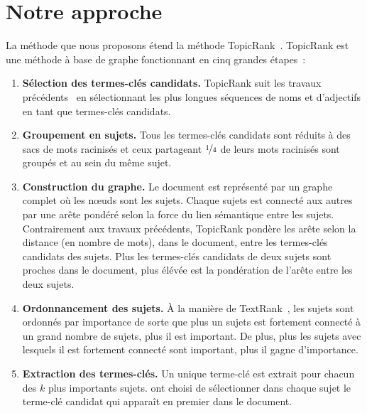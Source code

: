 \section{Notre approche}
\label{sec:main-domain_specific_keyphrase_annotation-topiccorank}
  La méthode que nous proposons étend la méthode
  TopicRank~\cite{bougouin2013topicrank}. TopicRank est une méthode à base de
  graphe fonctionnant en cinq grandes étapes~:
  \begin{enumerate}
    \item{\textbf{Sélection des termes-clés candidats.} TopicRank suit les
          travaux précédents~\cite{wan2008expandrank,hassan2010conundrums} en
          sélectionnant les plus longues séquences de noms et d'adjectifs en
          tant que termes-clés candidats.}
    \item{\textbf{Groupement en sujets.} Tous les termes-clés candidats sont
          réduits à des sacs de mots racinisés et ceux partageant
          $\unitfrac{1}{4}$ de leurs mots racinisés sont groupés et au sein du
          même sujet.}
    \item{\textbf{Construction du graphe.} Le document est représenté par un
          graphe complet où les n\oe{}uds sont les sujets. Chaque sujets est
          connecté aux autres par une arête pondéré selon la force du lien
          sémantique entre les sujets. Contrairement aux travaux précédents,
          TopicRank pondère les arête selon la distance (en nombre de mots),
          dans le document, entre les termes-clés candidats des sujets. Plus les
          termes-clés candidats de deux sujets sont proches dans le document,
          plus élévée est la pondération de l'arête entre les deux sujets.}
    \item{\textbf{Ordonnancement des sujets.} À la manière de
          TextRank~\cite{mihalcea2004textrank}, les sujets sont ordonnés par
          importance de sorte que plus un sujets est fortement connecté à un
          grand nombre de sujets, plus il est important. De plus, plus les
          sujets avec lesquels il est fortement connecté sont important, plus il
          gagne d'importance.}
    \item{\textbf{Extraction des termes-clés.} Un unique terme-clé est extrait
          pour chacun des $k$ plus importants sujets.
           ont choisi de sélectionner dans chaque
          sujet le terme-clé candidat qui apparaît en premier dans le document.}
  \end{enumerate}
  

